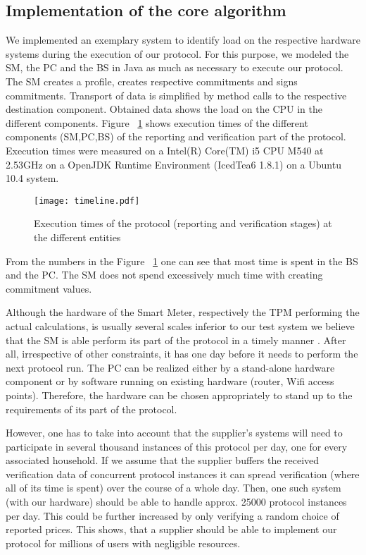 \documentclass[english]{llncs}
\begin{document}
\subsection{Implementation of the core algorithm}\label{implmentation}

We implemented an exemplary system to identify load on the respective hardware systems during the execution of our protocol. 
For this purpose, we modeled the SM, the PC and the 
BS in Java as much as necessary to execute our protocol. The SM creates a profile, creates respective commitments and signs commitments. Transport of data is simplified by method calls to the respective destination component. Obtained data shows the load on the CPU  in the different components. Figure ~\ref{table:cpuprotocol} shows execution times of the different components (SM,PC,BS) of the reporting and verification part of the protocol. Execution times were measured on a Intel(R) Core(TM) i5 CPU M540 at 2.53GHz on a OpenJDK Runtime Environment (IcedTea6 1.8.1) on a Ubuntu 10.4 system.





\begin{figure}
\texttt{[image: timeline.pdf]}
\caption{Execution times of the protocol (reporting and verification stages) at the different entities}
\label{table:cpuprotocol}
\end{figure}

From the numbers in the Figure ~\ref{table:cpuprotocol} one can see that most time is spent in the BS and the PC. The SM does not spend excessively much time with creating commitment values. 

Although the hardware of the Smart Meter, respectively the TPM performing the actual calculations, is usually several scales inferior to our test system we believe that the SM is able perform its part of the protocol in a timely manner \cite{standardjavacard}.
After all, irrespective of other constraints, it has one day before it needs to perform the next protocol run.
The PC can be realized either by a stand-alone hardware component or by software running on existing hardware (router, Wifi access points). Therefore, the hardware can be chosen appropriately to stand up to the requirements of its part of the protocol.

However, one has to take into account that the supplier's systems will need to participate in several thousand instances of this protocol per day, one for every associated household. If we assume that the supplier buffers the received verification data of concurrent protocol instances it can spread verification (where all of its time is spent) over the course of a whole day. Then, one such system (with our hardware) should be able to handle approx. 25000 protocol instances per day. This could be further increased by only verifying a random choice of reported prices. This shows, that a supplier should be able to implement our protocol for millions of users with negligible resources.
\end{document}
